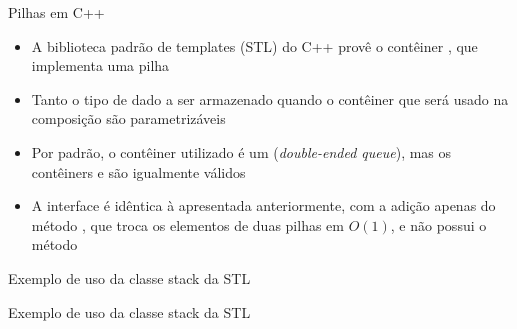 \begin{frame}[fragile]{Pilhas em C++}

    \begin{itemize}
        \item A biblioteca padrão de templates (STL) do C++ provê o contêiner ,
            que implementa uma pilha

        \item Tanto o tipo de dado a ser armazenado quando o contêiner que será usado na composição
            são parametrizáveis

        \item Por padrão, o contêiner utilizado é um  (\textit{double-ended queue}),
            mas os contêiners  e  são igualmente válidos

        \item A interface é idêntica à apresentada anteriormente, com a adição apenas do método
            , que troca os elementos de duas pilhas em $O(1)$, e não possui o
            método 

    \end{itemize}

\end{frame}

\begin{frame}[fragile]{Exemplo de uso da classe stack da STL}
\end{frame}

\begin{frame}[fragile]{Exemplo de uso da classe stack da STL}
\end{frame}
